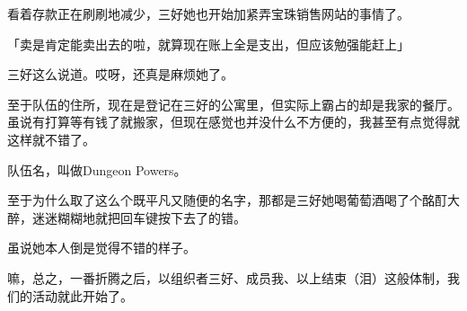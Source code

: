 看着存款正在刷刷地减少，三好她也开始加紧弄宝珠销售网站的事情了。

「卖是肯定能卖出去的啦，就算现在账上全是支出，但应该勉强能赶上」

三好这么说道。哎呀，还真是麻烦她了。

至于队伍的住所，现在是登记在三好的公寓里，但实际上霸占的却是我家的餐厅。虽说有打算等有钱了就搬家，但现在感觉也并没什么不方便的，我甚至有点觉得就这样就不错了。

队伍名，叫做Dungeon Powers。

至于为什么取了这么个既平凡又随便的名字，那都是三好她喝葡萄酒喝了个酩酊大醉，迷迷糊糊地就把回车键按下去了的错。

虽说她本人倒是觉得不错的样子。

嘛，总之，一番折腾之后，以组织者三好、成员我、以上结束（泪）这般体制，我们的活动就此开始了。
